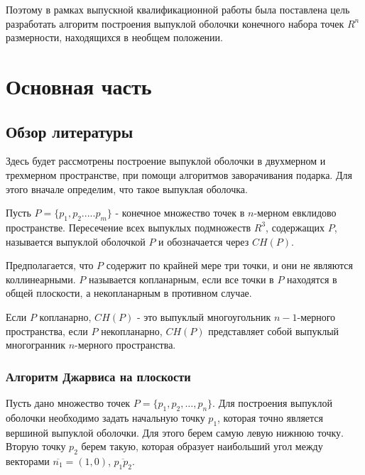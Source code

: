 \documentclass[a4paper,14pt]{extarticle}  %
\begin{document}
Поэтому в рамках выпускной квалификационной работы была поставлена цель разработать алгоритм построения выпуклой оболочки конечного набора точек $R^n$ размерности, находящихся в необщем положении.

\newpage
\section{Основная часть}
\subsection{Обзор литературы}
Здесь будет рассмотрены построение выпуклой оболочки в двухмерном и трехмерном пространстве, при помощи алгоритмов заворачивания подарка.
Для этого вначале определим, что такое выпуклая оболочка.

Пусть $P = \{p_1, p_2 ..... p_m\}$ - конечное множество точек в $n$-мерном евклидово пространстве.
Пересечение всех выпуклых подмножеств $R^3$, содержащих $P$, называется выпуклой оболочкой $P$ и обозначается через $CH(P)$.\cite{bib:kokichi}

Предполагается, что $P$ содержит по крайней мере три точки, и они не являются коллинеарными.
$P$ называется копланарным, если все точки в $P$ находятся в общей плоскости, а некопланарным в противном случае.

Если $P$ копланарно, $CH(P)$ - это выпуклый многоугольник $n-1$-мерного пространства, если $P$ некопланарно, $CH(P)$ представляет собой выпуклый многогранник $n$-мерного пространства.


\subsubsection{Алгоритм Джарвиса на плоскости}\label{sec:ch2}

Пусть дано множество точек $P=\{p_1,p_2,\ldots,p_n\}$.
Для построения выпуклой оболочки необходимо задать начальную точку $p_1$, которая точно является вершиной выпуклой оболочки. Для этого берем самую левую нижнюю точку.
Вторую точку $p_2$ берем такую, которая образует наибольший угол между векторами  $\overline{n_1} = (1,0)$, $\overline{p_{1}p_2}$.
\end{document}
